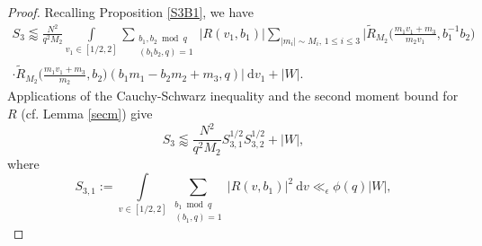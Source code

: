 \documentclass[12pt]{amsart}
\theoremstyle{definition}
\theoremstyle{plain}
\theoremstyle{remark}
\numberwithin{equation}{section}
\numberwithin{theorem}{section}
\numberwithin{equation}{section}
\begin{document}
	\begin{proof}
		Recalling Proposition \ref{S3B1}, we have 
		\begin{align*}S_{3}\lessapprox \frac{N^{2}}{q^{2}M_{2}}\int\limits_{ v_{1} \in [1/2, 2]}\sum_{\substack{ b_1,b_2 \bmod q \\ (b_1b_2, q)=1}}| R(v_{1}, b_{1})|\sum_{|m_{i}|\sim M_{i}, \, 1\leq i \leq 3}\Bigg|\tilde{R}_{M_{2}}\bigg(\frac{m_{1}v_{1}+m_{3}}{m_{2}v_{1}}, b_{1}^{-1}b_{2}\bigg)
			\\
			\cdot\tilde{R}_{M_{2}}\bigg(\frac{m_{1}v_{1}+m_{3}}{m_{2}}, b_{2}\bigg)(b_{1}m_{1}-b_{2}m_{2}+m_{3},q)\Bigg|\:\mathrm{d}v_{1}+|W|.
		\end{align*}
		Applications of the Cauchy-Schwarz inequality and the second moment bound for $R$ (cf. Lemma \ref{secm}) give
		\[S_{3}\lessapprox \frac{N^{2}}{q^{2}M_{2}}S_{3,1}^{1/2}S_{3,2}^{1/2}+|W|,\]
		where
		\[S_{3,1}:=\int\limits_{ v \in [1/2, 2]}\sum_{\substack{b_1 \bmod q \\ (b_{1}, q)=1 }}| R(v, b_{1})|^{2}\:\mathrm{d}v \ll_{\epsilon} \phi(q)|W|,\]
		

\end{proof}
\end{document}
